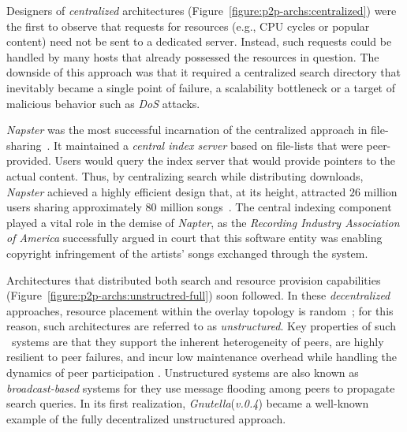 Designers of \emph{centralized} architectures 
(Figure~\ref{figure:p2p-archs:centralized}) were the first 
to observe that requests for resources
(e.g., CPU cycles or popular content) need not be sent to
a dedicated server. Instead, such requests could be handled by 
many hosts that already possessed the resources in question. 
The downside of this approach was that it required a 
centralized search directory that inevitably became 
a single point of failure, a scalability bottleneck or 
a target of malicious behavior such as \emph{DoS} attacks.

\emph{Napster} was the most successful incarnation of the
centralized approach in file-sharing~\cite{napster}.
It maintained a \emph{central index server} based on file-lists 
that were peer-provided.
Users would query the index server that would provide 
pointers to the actual content.
Thus, by centralizing search while distributing downloads,  \emph{Napster}
achieved a highly efficient design that, at its height, attracted $26$ million
users sharing approximately $80$ million songs~\cite{jmm_naptopusage_2001}.
The central indexing component played a vital role in the demise of 
\emph{Napter}, as the \emph{Recording
Industry Association of America} successfully argued in court that this software
entity was enabling copyright infringement of the artists' songs exchanged
through the system.

Architectures that distributed both search and resource provision 
capabilities (Figure~\ref{figure:p2p-archs:unstructred-full}) soon followed.
In these \emph{decentralized} approaches, 
resource placement within the overlay topology is random~\cite{YG-M2002};
for this reason, such architectures are referred to as \emph{unstructured}. 
Key properties of such \p\ systems are that they support the inherent heterogeneity
of peers, are highly resilient to peer failures, and incur low maintenance
overhead while handling the dynamics of peer participation
\cite{stutzbach_churn_2006}. 
Unstructured systems are also known as 
\emph{broadcast-based} systems for they use message flooding among %
peers to propagate search queries. 
In its first realization,
\emph{Gnutella}(\emph{v.0.4}) became a well-known example of the fully
decentralized unstructured approach.

